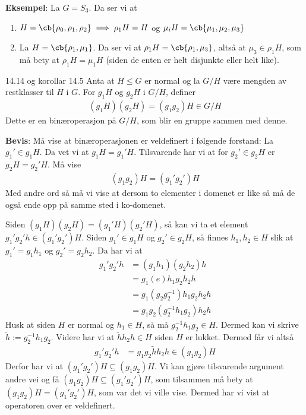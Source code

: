 \textbf{Eksempel}: La $G=S_3$. Da ser vi at
\begin{enumerate}
	\item $H=\cb{\rho_0, \rho_1, \rho_2}\implies \rho_1H=H$ og $\mu_i H=\cb{\mu_1, \mu_2, \mu_3}$
	\item La $H=\cb{\rho_1, \mu_1}$. Da ser vi at $\rho_1 H=\cb{\rho_1, \mu_3}$, altså at
	      $\mu_3\in \rho_1 H$, som må bety at $\rho_1 H=\mu_1 H$ (siden de enten er helt disjunkte
	      eller helt like).
\end{enumerate}

\begin{theorem*}{14.14 og korollar 14.5}{}
	Anta at $H\leq G$ er normal og la $G/H$ være mengden av restklasser til $H$ i $G$. For
	$g_1H$ og $g_2H$ i $G/H$, definer
	\begin{align}
		(g_1H)(g_2H)=(g_1g_2)H\in G/H
	\end{align}
	Dette er en binæroperasjon på $G/H$, som blir en gruppe sammen med denne.
\end{theorem*}

\textbf{Bevis}: Må vise at binæroperasjonen er veldefinert i følgende forstand: La
$g_1'\in g_1H$. Da vet vi at $g_1H=g_1'H$. Tilsvarende har vi at for $g_2'\in g_2H$ er
$g_2H=g_2'H$. Må vise
\begin{align}
	(g_1g_2)H=(g_1'g_2')H
\end{align}
Med andre ord så må vi vise at dersom to elementer i domenet er like så må de også ende opp
på samme sted i ko-domenet.

Siden $(g_1H)(g_2H)=(g_1'H)(g_2'H)$, så kan vi ta et element $g_1'g_2'h\in (g_1'g_2')H$. Siden
$g_1'\in g_1H$ og $g_2'\in g_2H$, så finnes $h_1, h_2\in H$ slik at $g_1'=g_1h_1$ og
$g_2'=g_2h_2$. Da har vi at
\begin{align}
	g_1'g_2'h & = (g_1h_1)(g_2h_2)h          \\
	          & = g_1(e)h_1g_2h_2h           \\
	          & = g_1(g_2g_2^{-1})h_1g_2h_2h \\
	          & = g_1g_2(g_2^{-1}h_1g_2)h_2h
\end{align}
Husk at siden $H$ er normal og $h_1\in H$, så må $g_2^{-1}h_1g_2\in H$. Dermed kan vi skrive
$\widetilde h := g_2^{-1}h_1g_2$. Videre har vi at $\widetilde{h}h_2h\in H$ siden $H$ er lukket.
Dermed får vi altså
\begin{align}
	g_1'g_2'h & = g_1g_2\widetilde{h}h_2h \in (g_1g_2)H
\end{align}
Derfor har vi at $(g_1'g_2')H\subseteq (g_1g_2)H$. Vi kan gjøre tilsvarende argument andre vei og
få $(g_1g_2)H\subseteq (g_1'g_2')H$, som tilsammen må bety at $(g_1g_2)H=(g_1'g_2')H$, som var
det vi ville vise. Dermed har vi vist at operatoren over er veldefinert.


